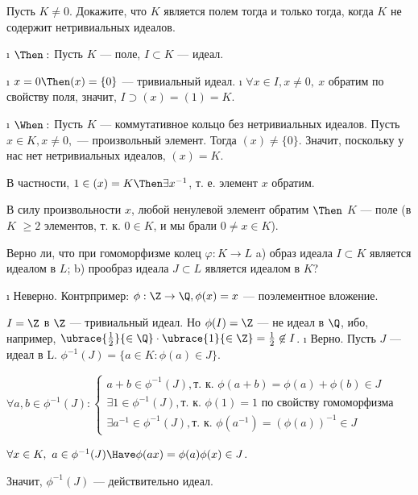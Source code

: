 \begin{problem}[17(3.15)]
Пусть $K \neq 0$. Докажите, что $K$ является полем тогда и только тогда, когда $K$ не содержит нетривиальных идеалов.
\end{problem}

\begin{solution}

\begin{itemize}
\i
  \(\Then:\)
  Пусть $K$ --- поле, \(I \subset K\) --- идеал.

  \begin{itemize}
  \tightlist
  \i
    \(x = 0 \Then (x) = \{0\}\) --- тривиальный идеал.
  \i
    \(\forall x \in I, x \ne 0, \ x\) обратим по свойству поля, значит, \(I \supset (x) = (1) = K\).
  \end{itemize}
\i
  \(\When:\)
  Пусть $K$ --- коммутативное кольцо без нетривиальных идеалов. Пусть \(x \in K, x \ne 0,\) --- произвольный элемент. Тогда \((x) \ne \{0\}\). Значит, поскольку у нас нет нетривиальных идеалов, \((x) = K\).

  В частности, \(1 \in (x) = K \Then \exists x^{-1}\), т. е. элемент $x$ обратим.

  В силу произвольности $x$, любой ненулевой элемент обратим \(\Then\) $K$ --- поле (в $K$ \(\ge 2\) элементов, т. к. \(0 \in K\), и мы брали \(0\ne x \in K\)).
\end{itemize}

\end{solution}

\begin{problem}[18(4.1)]
Верно ли, что при гомоморфизме колец $\varphi: K \to L$ 
a) образ идеала $I \subset K$ является идеалом в $L$; b) прообраз идеала $J \subset L$ является идеалом в $K$?
\end{problem}
\begin{solution}
\begin{enumerate}
\def\labelenumi{\alph{enumi})}
\i
  Неверно. Контрпример: \(\phi:\Z \to \Q, \phi(x)=x\) --- поэлементное вложение.

  \(I=\Z\) в \(\Z\) --- тривиальный идеал. Но \(\phi(I)=\Z\) --- не идеал в \(\Q\), ибо, например, \(\ubrace{\frac{1}{2}}{\in \Q} \cdot \ubrace{1}{\in \Z} = \frac{1}{2} \not\in I\).
\i
  Верно. Пусть \(J\) --- идеал в L. \(\phi^{-1}(J) = \{a \in K : \phi(a) \in J\}\).

  \(\forall a, b \in \phi^{-1}(J): 
	\begin{cases} 
		a+b \in \phi^{-1}(J), \text{т. к. } \phi(a+b) = \phi(a)+\phi(b) \in J \\
		\exists 1 \in \phi^{-1}(J), \text{т. к. } \phi(1)=1 \text{ по свойству гомоморфизма}\\
		\exists a^{-1} \in \phi^{-1}(J), \text{т. к. }\phi(a^{-1}) = (\phi(a))^{-1} \in J 
	\end{cases}\)

  \(\forall x \in K,\ a \in \phi^{-1}(J) \Have \phi(ax)=\phi(a)\phi(x) \in J\).

  Значит, \(\phi^{-1}(J)\) --- действительно идеал.
\end{enumerate}
\end{solution}


